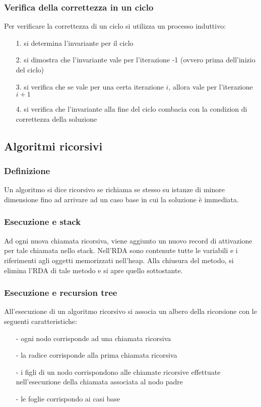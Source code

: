\documentclass[a4paper]{article}
\begin{document}
\subsubsection*{Verifica della correttezza in un ciclo}
Per verificare la correttezza di un ciclo si utilizza un processo induttivo:
\begin{itemize}[topsep=3pt, itemsep=0pt]
	\item[1.] si determina l'invariante per il ciclo
	\item[2.] si dimostra che l'invariante vale per l'iterazione -1 (ovvero prima dell'inizio del ciclo)
	\item[3.] si verifica che se vale per una certa iterazione \(i\), allora vale per l'iterazione \(i+1\)
	\item[4.] si verifica che l'invariante alla fine del ciclo combacia con la condizion di correttezza della soluzione
\end{itemize}

\subsection{Algoritmi ricorsivi}
\subsubsection*{Definizione}
Un algoritmo si dice ricorsivo se richiama se stesso su istanze di minore dimensione fino ad arrivare ad un caso base in cui la
soluzione è immediata.

\subsubsection*{Esecuzione e stack}
Ad ogni nuova chiamata ricorsiva, viene aggiunto un nuovo record di attivazione per tale chiamata nello stack. Nell'RDA sono
contenute tutte le variabili e i riferimenti agli oggetti memorizzati nell'heap. Alla chiusura del metodo, si elimina l'RDA
di tale metodo e si apre quello sottostante.

\subsubsection*{Esecuzione e recursion tree}
All'esecuzione di un algoritmo ricorsivo si associa un albero della ricorsione con le seguenti caratteristiche:
\begin{itemize}[topsep=3pt, itemsep=0pt]
	\item[-] ogni nodo corrisponde ad una chiamata ricorsiva
	\item[-] la radice corrisponde alla prima chiamata ricorsiva
	\item[-] i figli di un nodo corrispondono alle chiamate ricorsive effettuate nell'esecuzione della chiamata associata al nodo padre
	\item[-] le foglie corrispondo ai casi base
\end{itemize}
\end{document}
